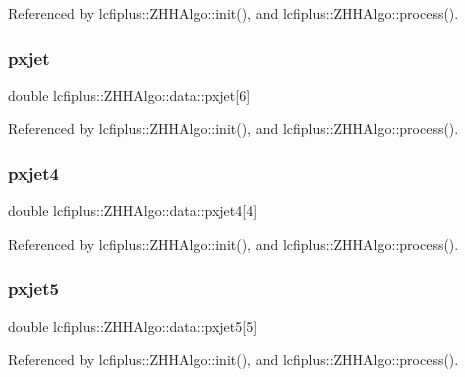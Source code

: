 Referenced by lcfiplus\+::\+Z\+H\+H\+Algo\+::init(), and lcfiplus\+::\+Z\+H\+H\+Algo\+::process().

\mbox{\label{structlcfiplus_1_1ZHHAlgo_1_1data_ae6cceacbe6a265bab5e57691813567a5}} 
\subsubsection{pxjet}
{\footnotesize\ttfamily double lcfiplus\+::\+Z\+H\+H\+Algo\+::data\+::pxjet[6]}



Referenced by lcfiplus\+::\+Z\+H\+H\+Algo\+::init(), and lcfiplus\+::\+Z\+H\+H\+Algo\+::process().

\mbox{\label{structlcfiplus_1_1ZHHAlgo_1_1data_acd342cfd1ab2098c75b0b259b39a7a7f}} 
\subsubsection{pxjet4}
{\footnotesize\ttfamily double lcfiplus\+::\+Z\+H\+H\+Algo\+::data\+::pxjet4[4]}



Referenced by lcfiplus\+::\+Z\+H\+H\+Algo\+::init(), and lcfiplus\+::\+Z\+H\+H\+Algo\+::process().

\mbox{\label{structlcfiplus_1_1ZHHAlgo_1_1data_a60eaa9eb250f65abcb444e28881bb69a}} 
\subsubsection{pxjet5}
{\footnotesize\ttfamily double lcfiplus\+::\+Z\+H\+H\+Algo\+::data\+::pxjet5[5]}



Referenced by lcfiplus\+::\+Z\+H\+H\+Algo\+::init(), and lcfiplus\+::\+Z\+H\+H\+Algo\+::process().

\mbox{\label{structlcfiplus_1_1ZHHAlgo_1_1data_a67f9f2bbf69633142cdbb136abfb4b48}} 
